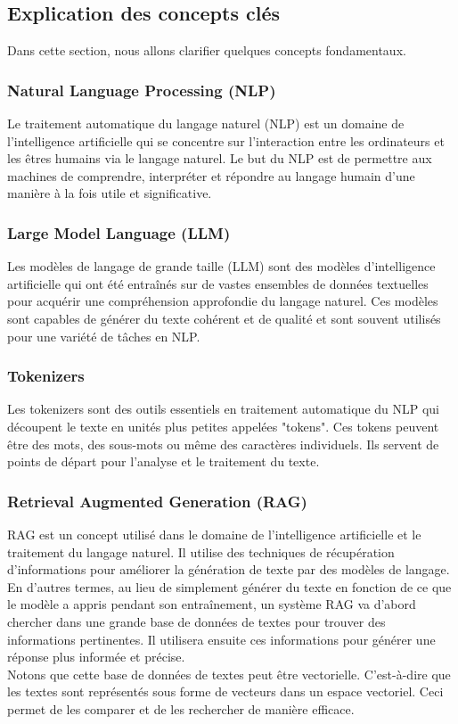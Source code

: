 \subsection{Explication des concepts clés}
\justifying
Dans cette section, nous allons clarifier quelques concepts fondamentaux.

\subsubsection{Natural Language Processing (NLP)}
\justifying
Le traitement automatique du langage naturel (NLP) est un domaine de l'intelligence artificielle qui se concentre sur l'interaction entre les ordinateurs et les êtres humains via le langage naturel. Le but du NLP est de permettre aux machines de comprendre, interpréter et répondre au langage humain d'une manière à la fois utile et significative.

\subsubsection{Large Model Language (LLM)}
\justifying
Les modèles de langage de grande taille (LLM) sont des modèles d'intelligence artificielle qui ont été entraînés sur de vastes ensembles de données textuelles pour acquérir une compréhension approfondie du langage naturel. Ces modèles sont capables de générer du texte cohérent et de qualité et sont souvent utilisés pour une variété de tâches en NLP.

\subsubsection{Tokenizers}
\justifying
Les tokenizers sont des outils essentiels en traitement automatique du NLP qui découpent le texte en unités plus petites appelées "tokens". Ces tokens peuvent être des mots, des sous-mots ou même des caractères individuels. Ils servent de points de départ pour l'analyse et le traitement du texte.

\subsubsection{Retrieval Augmented Generation (RAG) }
RAG est un concept utilisé dans le domaine de l'intelligence artificielle et le traitement du langage naturel. Il utilise des techniques de récupération d'informations pour améliorer la génération de texte par des modèles de langage. \\
En d'autres termes, au lieu de simplement générer du texte en fonction de ce que le modèle a appris pendant son entraînement, un système RAG va d'abord chercher dans une grande base de données de textes pour trouver des informations pertinentes. Il utilisera ensuite ces informations pour générer une réponse plus informée et précise.\\
Notons que cette base de données de textes peut être vectorielle. C'est-à-dire que les textes sont représentés sous forme de vecteurs dans un espace vectoriel. Ceci permet de les comparer et de les rechercher de manière efficace.


